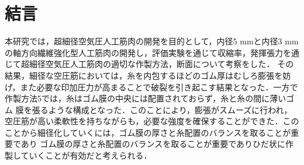 \newpage
\section{結言}
本研究では，超細径空気圧人工筋肉の開発を目的として，内径5 mmと内径3 mmの軸方向繊維強化型人工筋肉の開発し，評価実験を通じて収縮率，発揮張力を通じて超細径空気圧人工筋肉の適切な作製方法，断面について考察をした．
 その結果，細径な空圧筋においては，糸を内包するほどのゴム厚はむしろ膨張を妨げ，また必要な印加圧力が高まることで破裂を引き起こす結果となった．一方で作製方法5では，糸はゴム膜の中央には配置されておらず，糸と糸の間に薄いゴム
 膜を張るような構成となった．このことにより，膨張がスムーズに行われ，空圧筋が高い柔軟性を持ちながらも，必要な強度を確保することができた．このことから細径化していくには，ゴム膜の厚さと糸配置のバランスを取ることが重要であり
 ゴム膜の厚さと糸配置のバランスを取ることが重要でありひだ状に作製していくことが有効だと考えられる．
